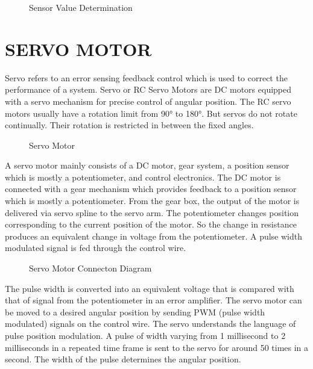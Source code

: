 \documentclass[a4paper, 12pt, notitlepage]{report}
\begin{document}
\begin{figure}[h!]
{\par}
\caption{Sensor Value Determination}
\end{figure}

\newpage
\section{SERVO MOTOR}

Servo refers to an error sensing feedback control which is used to correct the performance of a system. Servo or RC Servo Motors are DC motors equipped with a servo mechanism for  precise  control  of  angular  position.  The  RC  servo  motors  usually  have  a  rotation  limit from 90° to 180°. But servos do not rotate continually. Their rotation is restricted in between the fixed angles. \\

\begin{figure}[h!]
{\par}
\caption{Servo Motor}
\end{figure}

A servo motor mainly consists of a DC motor, gear system, a position sensor which is mostly a potentiometer, and control electronics. The DC motor is connected with a gear mechanism which provides feedback to a position sensor which is mostly a potentiometer. From the gear box, the output of the motor is delivered via servo spline to the servo arm. The potentiometer changes  position  corresponding  to  the  current  position  of  the  motor.  So the  change  in resistance produces an equivalent change in voltage from the potentiometer. A pulse width modulated  signal  is  fed  through  the  control  wire.\\ 

\begin{figure}[h!]
{\par}
\caption{Servo Motor Connecton Diagram}
\end{figure}

 The  pulse  width  is  converted  into  an equivalent  voltage  that  is  compared  with  that  of  signal  from  the  potentiometer  in  an  error amplifier. The servo motor can be moved to a desired angular position by sending PWM (pulse width modulated)  signals  on  the  control  wire. The  servo  understands  the  language  of  pulse position  modulation.  A  pulse  of  width  varying  from  1  millisecond  to  2  milliseconds  in  a repeated time frame is sent to the servo for around 50 times in a second. The width of the
pulse determines the angular position.
\end{document}
